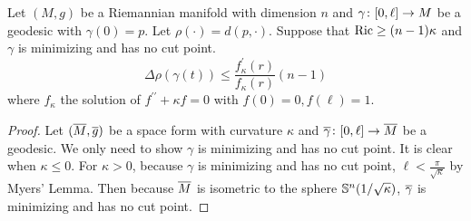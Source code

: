\begin{enumerate}[label=\arabic{*}]
	\begin{thm}\label{thm:laplaciancomp}
		Let $(M,g)$ be a Riemannian manifold with dimension $n$ and $\gamma\colon [0,\ell] \rightarrow M$ be a geodesic with $\gamma(0) = p$. Let $\rho(\cdot) = d(p,\cdot)$. Suppose that $\operatorname{Ric} \geq (n-1)\kappa$ and $\gamma$ is minimizing and has no cut point.
		\begin{equation*}
			\Delta \rho(\gamma(t)) \leq \frac{f_\kappa^\prime(r)}{f_\kappa(r)}(n-1)
		\end{equation*}
		where $f_\kappa$ the solution of $f^{\prime\prime} + \kappa f = 0$ with $f(0) = 0,f(\ell) = 1$.
	\end{thm}
	\begin{proof}
		Let $(\overline{M},\overline{g})$ be a space form with curvature $\kappa$ and $\overline{\gamma} \colon [0,\ell] \rightarrow \overline{M}$ be a geodesic. We only need to show $\gamma$ is minimizing and has no cut point. It is clear when $\kappa \leq 0$.  For $\kappa > 0$, because $\gamma$ is minimizing and has no cut point, $\ell < \frac{\pi}{\sqrt{\kappa}}$ by Myers' Lemma. Then because $\overline{M}$ is isometric to the sphere $\mathbb{S}^n(1 / \sqrt{\kappa})$, $\overline{\gamma}$ is minimizing and has no cut point. 
	\end{proof}
	

\end{enumerate}
